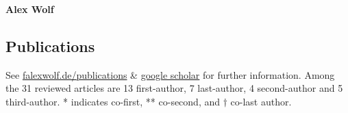 \documentclass[11pt]{scrartcl}
\def\newline{\\[.4em]}
\begin{document}
\thispagestyle{firstpage}
\pagestyle{fancy}
\vspace*{1em}
\begin{center}\textbf{\LARGE{Alex Wolf}}\end{center}


\setlength\LTleft{0em}
\subsection*{Publications}
See \href{https://falexwolf.de/publications}{falexwolf.de/publications} \& \href{http://scholar.google.de/citations?user=1FnOtMoAAAAJ\&hl=en}{google scholar} for further information. Among the 31 reviewed articles are 13 first-author, 7 last-author, 4 second-author and 5 third-author. * indicates co-first, ** co-second, and $\dagger$ co-last author.
\def\newline{\\[.6em]}


\newpage
\vspace{0em}

\end{document}

